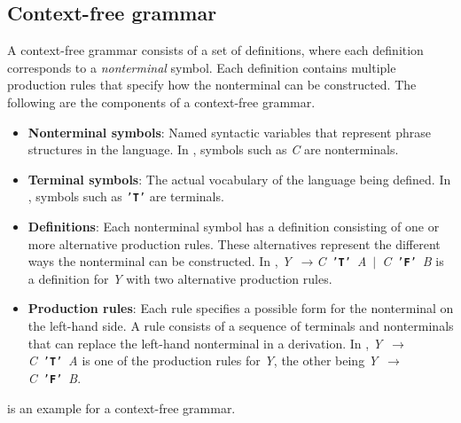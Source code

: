 \documentclass[conference]{IEEEtran}
\def\term#1{\texttt{'\textbf{#1}'}}
\def\nonterm#1{\textlangle\textnormal{\emph{#1}}\textrangle}
\def\expandsto{\(\rightarrow{}\)}
\begin{document}
\subsection{Context-free grammar}

A context-free grammar consists of a set of definitions, where each definition corresponds to a \emph{nonterminal} symbol. Each definition contains multiple production rules that specify how the nonterminal can be constructed. The following
are the components of a context-free grammar.

\begin{itemize}
    \item \textbf{Nonterminal symbols}: Named syntactic variables that represent phrase structures in the language. In , symbols such as \nonterm{C} are nonterminals.
    \item \textbf{Terminal symbols}: The actual vocabulary of the language being defined. In , symbols such as \term{T} are terminals.
    \item \textbf{Definitions}: Each nonterminal symbol has a definition consisting of one or more alternative production rules. These alternatives represent the different ways the nonterminal can be constructed. In , 
    \mbox{\nonterm{Y} \expandsto \nonterm{C} \term{T} \nonterm{A} $|$ \nonterm{C} \term{F} \nonterm{B}}
    is a definition for \nonterm{Y} with two alternative production rules. 
    \item \textbf{Production rules}: Each rule specifies a possible form for the nonterminal on the left-hand side. A rule consists of a sequence of terminals and nonterminals that can replace the left-hand nonterminal in a derivation.
    In , 
    \mbox{\nonterm{Y} \expandsto \nonterm{C} \term{T} \nonterm{A}} is one of the production rules for \nonterm{Y}, the other being \mbox{\nonterm{Y} \expandsto \nonterm{C} \term{F} \nonterm{B}}.
\end{itemize}
 is an example for a context-free grammar.


\end{document}
